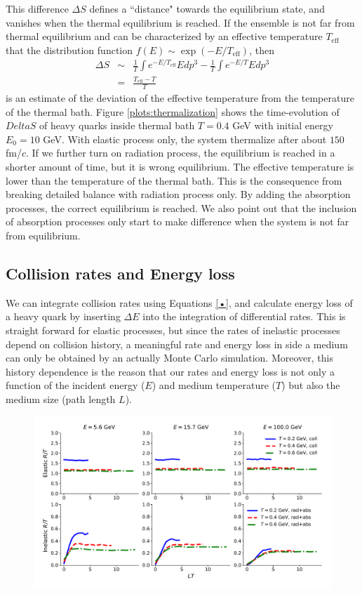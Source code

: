 \documentclass[aps, prc, reprint, amsmath, groupedaddress, nofootinbib]{revtex4-1}
\begin{document}
This difference $\Delta S$ defines a ``distance" towards the equilibrium state, and vanishes when the thermal equilibrium is reached.
If the ensemble is not far from thermal equilibrium and can be characterized by an effective temperature $T_{\textrm{eff}}$ that the distribution function $f(E)\sim \exp(-E/T_{\textrm{eff}})$, then
\begin{eqnarray}
\nonumber
\Delta S &\sim& \frac{1}{T}\int  e^{-E/T_{\textrm{eff}}} E dp^3 - \frac{1}{T}\int e^{-E/T} E dp^3 \\
&=& \frac{T_\textrm{eff}-T}{T}
\end{eqnarray}
is an estimate of the deviation of the effective temperature from the temperature of the thermal bath.
Figure \ref{plots:thermalization} shows the time-evolution of $Delta S$ of heavy quarks inside thermal bath $T=0.4$ GeV with initial energy $E_0 = 10$ GeV.
With elastic process only, the system thermalize after about $150$ fm/$c$.
If we further turn on radiation process, the equilibrium is reached in a shorter amount of time, but it is wrong equilibrium.
The effective temperature is lower than the temperature of the thermal bath.
This is the consequence from breaking detailed balance with radiation process only.
By adding the absorption processes, the correct equilibrium is reached.
We also point out that the inclusion of absorption processes only start to make difference when the system is not far from equilibrium.

\subsection{Collision rates and Energy loss}
We can integrate collision rates using Equations \ref{•}, and calculate energy loss of a heavy quark by inserting $\Delta E$ into the integration of differential rates.
This is straight forward for elastic processes, but since the rates of inelastic processes depend on collision history, a meaningful rate and energy loss in side a medium can only be obtained by an actually Monte Carlo simulation.
Moreover, this history dependence is the reason that our rates and energy loss is not only a function of the incident energy ($E$) and medium temperature ($T$) but also the medium size (path length $L$).

\begin{figure}
\includegraphics[width=\textwidth]{BoxRate.pdf}
\caption{}\label{plots:BoxRate}
\end{figure}
\end{document}
